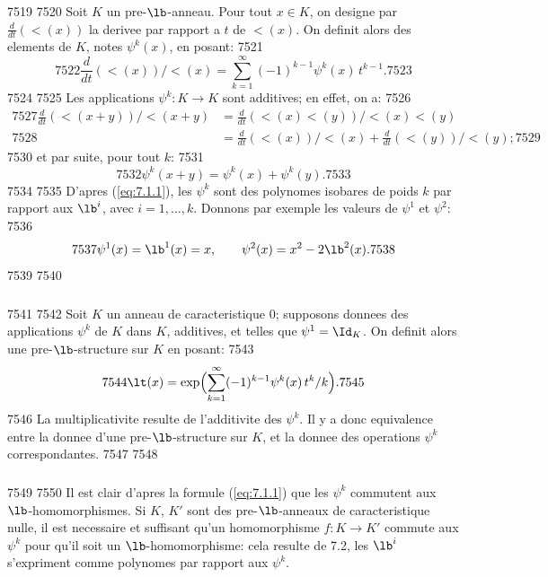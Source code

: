   7519	
  7520	Soit $K$ un pre-$\lb$-anneau. Pour tout $x \in K$, on designe par $\frac{d}{dt}(\lt(x))$ la derivee par rapport a $t$ de $\lt(x)$. On definit alors des elements de $K$, notes $\psi^k(x)$, en posant:
  7521	\begin{equation}\label{eq:7.1.1}
  7522	\frac{d}{dt}(\lt(x))/\lt(x) = \sum_{k=1}^{\infty} (-1)^{k-1} \psi^k(x)\, t^{k-1}.
  7523	\end{equation}
  7524	
  7525	Les applications $\psi^k : K \longrightarrow K$ sont additives; en effet, on a:
  7526	\begin{align*}
  7527	\frac{d}{dt}(\lt(x+y))/\lt(x+y) &= \frac{d}{dt}(\lt(x)\lt(y))/\lt(x)\lt(y) \\
  7528	&= \frac{d}{dt}(\lt(x))/\lt(x) + \frac{d}{dt}(\lt(y))/\lt(y);
  7529	\end{align*}
  7530	et par suite, pour tout $k$:
  7531	\[
  7532	\psi^k(x+y) = \psi^k(x) + \psi^k(y).
  7533	\]
  7534	
  7535	D'apres (\ref{eq:7.1.1}), les $\psi^k$ sont des polynomes isobares de poids $k$ par rapport aux $\lb^i$, avec $i=1,\ldots,k$. Donnons par exemple les valeurs de $\psi^1$ et $\psi^2$:
  7536	\[
  7537	\psi^1(x) = \lb^1(x) = x, \qquad \psi^2(x) = x^2 - 2\lb^2(x).
  7538	\]
  7539	
  7540	\subsubsection{}
  7541	
  7542	Soit $K$ un anneau de caracteristique $0$; supposons donnees des applications $\psi^k$ de $K$ dans $K$, additives, et telles que $\psi^1 = \Id_K$. On definit alors une pre-$\lb$-structure sur $K$ en posant:
  7543	\begin{equation}\label{eq:7.2.1}
  7544	\lt(x) = \exp\Bigl(\sum_{k=1}^{\infty} (-1)^{k-1} \psi^k(x)\, t^k/k\Bigr).
  7545	\end{equation}
  7546	La multiplicativite resulte de l'additivite des $\psi^k$. Il y a donc equivalence entre la donnee d'une pre-$\lb$-structure sur $K$, et la donnee des operations $\psi^k$ correspondantes.
  7547	
  7548	\subsubsection{}
  7549	
  7550	Il est clair d'apres la formule (\ref{eq:7.1.1}) que les $\psi^k$ commutent aux $\lb$-homomorphismes. Si $K$, $K'$ sont des pre-$\lb$-anneaux de caracteristique nulle, il est necessaire et suffisant qu'un homomorphisme $f : K \longrightarrow K'$ commute aux $\psi^k$ pour qu'il soit un $\lb$-homomorphisme: cela resulte de 7.2, les $\lb^i$ s'expriment comme polynomes par rapport aux $\psi^k$.

